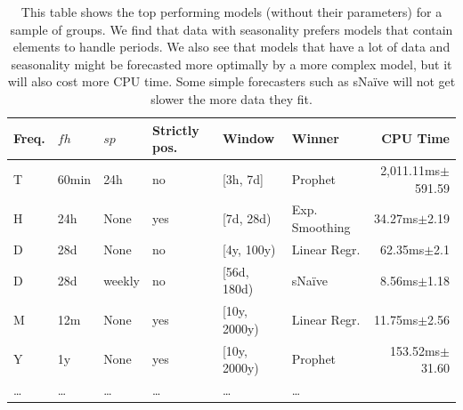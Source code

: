 \begin{table}
\fontsize{9pt}{12pt}\selectfont
\begin{tabular}{llllllr}
Freq. & $fh$ & $sp$ & Strictly pos. & Window & Winner & CPU Time \\
\hline
T    & 60min & 24h    & no  & [3h, 7d]     & Prophet        & 2,011.11ms$\pm$591.59\\
H    & 24h   & None   & yes & [7d, 28d)    & Exp. Smoothing &    34.27ms$\pm$2.19 \\
D    & 28d   & None   & no  & [4y, 100y)   & Linear Regr.   &    62.35ms$\pm$2.1\\
D    & 28d   & weekly & no  & [56d, 180d)  & sNa\"ive       &     8.56ms$\pm$1.18  \\
M    & 12m   & None   & yes & [10y, 2000y) & Linear Regr.   &    11.75ms$\pm$2.56 \\
Y    & 1y    & None   & yes & [10y, 2000y) & Prophet        &   153.52ms$\pm$31.60 \\
\ldots & \ldots & \ldots & \ldots & \ldots & \ldots
\end{tabular}
\caption{This table shows the top performing models (without their parameters) for a sample of groups. We find that data with seasonality prefers models that contain elements to handle periods. We also see that models that have a lot of data and seasonality might be forecasted more optimally by a more complex model, but it will also cost more CPU time. Some simple forecasters such as sNa\"ive will not get slower the more data they fit.}
\label{tab:bestModelPerGroup}
\end{table}


